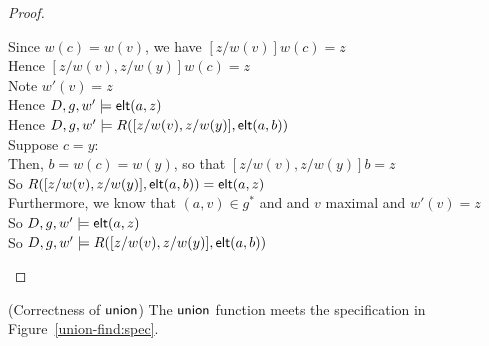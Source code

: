 \begin{proof}
\begin{tabbedproof}
\ooooo Since $w(c) = w(v)$, we have $[z/w(v)]w(c) = z$ \\
\ooooo Hence $[z/w(v), z/w(y)]w(c) = z$ \\
\ooooo Note $w'(v) = z$ \\
\ooooo Hence $D, g, w' \models \mathsf{elt}({a}, {z})$ \\
\ooooo Hence $D, g, w' \models R([z/w(v), z/w(y)], \mathsf{elt}({a}, {b}))$ \\
\ooo Suppose $c = y$: \\
\oooo Then, $b = w(c) = w(y)$, so that $[z/w(v), z/w(y)]b = z$\\ 
\oooo So $R([z/w(v), z/w(y)], \mathsf{elt}({a}, {b})) = \mathsf{elt}({a}, {z})$ \\
\oooo Furthermore, we know that $(a, v) \in g^*$ and and $v$ maximal and $w'(v) = z$ \\
\oooo So $D, g, w' \models \mathsf{elt}({a}, {z})$ \\
\oooo So $D, g, w' \models R([z/w(v),z/w(y)], \mathsf{elt}({a}, {b}))$ 
\end{tabbedproof}
\end{proof}

\begin{lemma}{(Correctness of $\mathsf{union}$)}
The $\mathsf{union}$ function meets the specification in Figure~\ref{union-find:spec}. 
\end{lemma}

